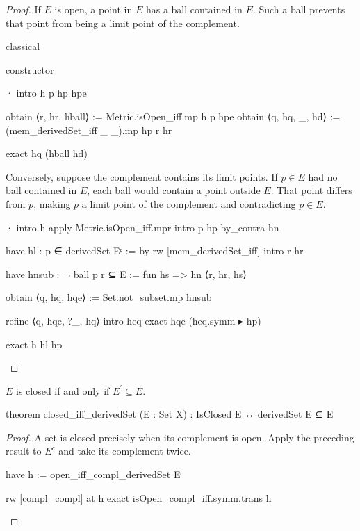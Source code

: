 \begin{proof}
  If $E$ is open, a point in $E$ has a ball contained in $E$.
  Such a ball prevents that point from being a limit point of the complement.

  \begin{lean}
    classical

    constructor

    · intro h p hp hpe

      obtain ⟨r, hr, hball⟩ := Metric.isOpen_iff.mp h p hpe
      obtain ⟨q, hq, _, hd⟩ := (mem_derivedSet_iff _ _).mp hp r hr

      exact hq (hball hd)
  \end{lean}

  Conversely, suppose the complement contains its limit points.
  If $p\in E$ had no ball contained in $E$, each ball would contain a point outside $E$.
  That point differs from $p$, making $p$ a limit point of the complement and contradicting $p\in
    E$.

  \begin{lean}
    · intro h
      apply Metric.isOpen_iff.mpr
      intro p hp
      by_contra hn

      have hl : p ∈ derivedSet Eᶜ := by
        rw [mem_derivedSet_iff]
        intro r hr

        have hnsub : ¬ ball p r ⊆ E := fun hs => hn ⟨r, hr, hs⟩

        obtain ⟨q, hq, hqe⟩ := Set.not_subset.mp hnsub

        refine ⟨q, hqe, ?_, hq⟩
        intro heq
        exact hqe (heq.symm ▸ hp)

      exact h hl hp
  \end{lean}

\end{proof}

\begin{lemma}
  \label{an1:lem:closed-iff-limitPoints}
  $E$ is closed if and only if $E^{\prime}\subseteq E$.

  \begin{lean}
    theorem closed_iff_derivedSet (E : Set X) :
        IsClosed E ↔ derivedSet E ⊆ E
  \end{lean}
\end{lemma}

\begin{proof}
  A set is closed precisely when its complement is open.
  Apply the preceding result to $E^{c}$ and take its complement twice.

  \begin{lean}
    have h := open_iff_compl_derivedSet Eᶜ

    rw [compl_compl] at h
    exact isOpen_compl_iff.symm.trans h
  \end{lean}

\end{proof}

